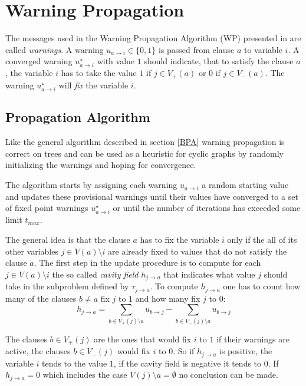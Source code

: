 \section{Warning Propagation}

The messages used in the Warning Propagation Algorithm (WP) presented in \cite{survprob} are called \emph{warnings}. A warning $u_{a\rightarrow i} \in \{0, 1\}$ is passed from clause $a$ to variable $i$. A converged warning  $u^{\star}_{a\rightarrow i}$ with value $1$ should indicate, that  to satisfy the clause $a$, the variable $i$ has to take the value $1$ if $j \in V_+(a)$ or $0$ if $j \in V_-(a)$. The warning $u^{\star}_{a \rightarrow i}$ will \emph{fix} the variable $i$. 
\subsection{Propagation Algorithm}

Like the general algorithm described in section \ref{BPA} warning propagation is correct on trees and can be used as a heuristic for cyclic graphs by randomly initializing the warnings and hoping for convergence.

The algorithm starts by assigning each warning $u_{a\rightarrow i}$ a random starting value and updates these provisional warnings until their values have converged to a set of fixed point warnings $u^{\star}_{a \rightarrow i}$ or until the number of iterations has exceeded some limit $t_{max}$.

The general idea is that the clause $a$ has to fix the variable $i$ only if the all of its other variables $j \in V(a)\setminus i$ are already fixed to values that do not satisfy the clause $a$. \newline
The first step in the update procedure is to compute for each $j \in V(a) \setminus i$ the so called \emph{cavity field} $h_{j \rightarrow a}$ that indicates what value $j$ should take in the subproblem defined by $\tau_{j \rightarrow a}$. To compute $h_{j \rightarrow a}$ one has to count how many of the clauses $b \neq a$ fix $j$ to $1$ and how many fix $j$ to $0$:
$$h_{j \rightarrow a} = \sum_{b \in V_+(j)\setminus a}{u_{b \rightarrow j}} - \sum_{b \in V_-(j)\setminus a}{u_{b \rightarrow j}}$$

The clauses $b \in V_+(j)$ are the ones that would fix $i$ to $1$ if their warnings are active, the clauses $b \in V_-(j)$ would fix $i$ to $0$.
So if $h_{j \rightarrow a}$ is positive, the variable $i$ tends to the value $1$, if the cavity field is negative it tends to $0$. If $h_{j \rightarrow a} = 0$ which includes the case $V(j) \setminus a = \emptyset$ no conclusion can be made.

